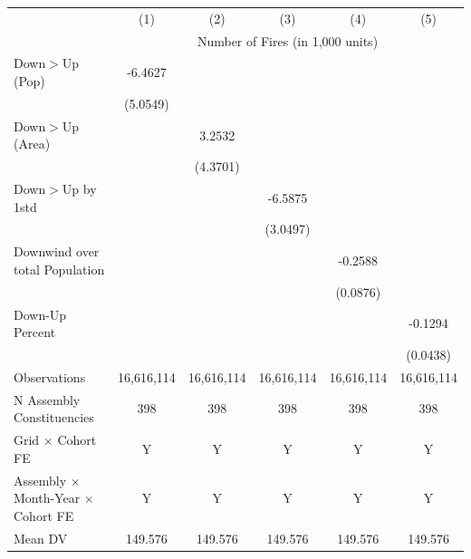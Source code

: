 \begin{tabular}{lccccc}
\hline
& (1) & (2) & (3) & (4) & (5)\\
& \multicolumn{5}{c}{Number of Fires (in 1,000 units) }\\
\hline

Down$>$Up (Pop)&     -6.4627         &                     &                     &                     &                     \\
            &    (5.0549)         &                     &                     &                     &                     \\
Down$>$Up (Area)&                     &      3.2532         &                     &                     &                     \\
            &                     &    (4.3701)         &                     &                     &                     \\
Down$>$Up by 1std&                     &                     &     -6.5875\sym{**} &                     &                     \\
            &                     &                     &    (3.0497)         &                     &                     \\
Downwind over total Population&                     &                     &                     &     -0.2588\sym{***}&                     \\
            &                     &                     &                     &    (0.0876)         &                     \\
Down-Up Percent&                     &                     &                     &                     &     -0.1294\sym{***}\\
            &                     &                     &                     &                     &    (0.0438)         \\
\hline
Observations&  16,616,114         &  16,616,114         &  16,616,114         &  16,616,114         &  16,616,114         \\
N Assembly Constituencies&         398         &         398         &         398         &         398         &         398         \\
Grid $\times$ Cohort FE&           Y         &           Y         &           Y         &           Y         &           Y         \\
Assembly $\times$ Month-Year $\times$ Cohort FE&           Y         &           Y         &           Y         &           Y         &           Y         \\
Mean DV     &     149.576         &     149.576         &     149.576         &     149.576         &     149.576         \\
\hline
\end{tabular}
